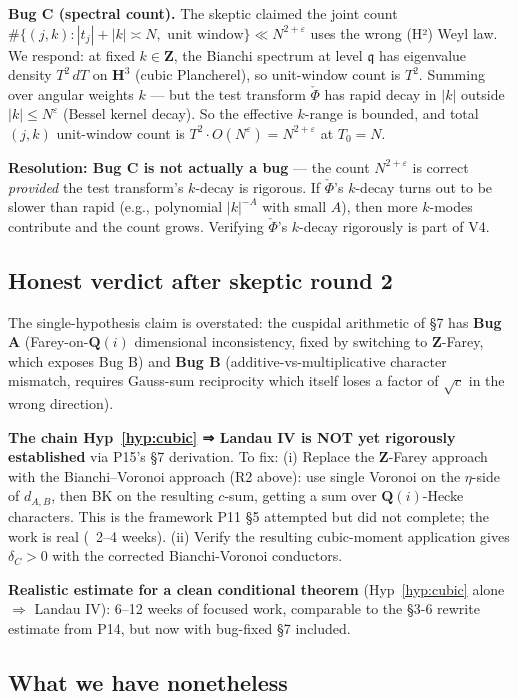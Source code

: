 \documentclass[11pt]{article}
\theoremstyle{definition}
\newcommand{\Z}{\mathbf{Z}}
\newcommand{\Q}{\mathbf{Q}}
\newcommand{\HH}{\mathbf{H}}
\newcommand{\Qi}{\Q(i)}
\newcommand{\qq}{\mathfrak{q}}
\begin{document}
\textbf{Bug C (spectral count).}
The skeptic claimed the joint count $\#\{(j,k):|t_j|+|k|\asymp N,\text{ unit window}\}\ll N^{2+\varepsilon}$ uses the wrong (H²) Weyl law. We respond: at fixed $k\in\Z$, the Bianchi spectrum at level $\qq$ has eigenvalue density $T^2\,dT$ on $\HH^3$ (cubic Plancherel), so unit-window count is $T^2$. Summing over angular weights $k$ — but the test transform $\check\Phi$ has rapid decay in $|k|$ outside $|k|\le N^\varepsilon$ (Bessel kernel decay). So the effective $k$-range is bounded, and total $(j,k)$ unit-window count is $T^2\cdot O(N^\varepsilon)=N^{2+\varepsilon}$ at $T_0=N$.

\textbf{Resolution: Bug C is not actually a bug} — the count $N^{2+\varepsilon}$ is correct \emph{provided} the test transform's $k$-decay is rigorous. If $\check\Phi$'s $k$-decay turns out to be slower than rapid (e.g., polynomial $|k|^{-A}$ with small $A$), then more $k$-modes contribute and the count grows. Verifying $\check\Phi$'s $k$-decay rigorously is part of V4.

\subsection*{Honest verdict after skeptic round 2}

The single-hypothesis claim is overstated: the cuspidal arithmetic of §7 has \textbf{Bug A} (Farey-on-$\Qi$ dimensional inconsistency, fixed by switching to $\Z$-Farey, which exposes Bug B) and \textbf{Bug B} (additive-vs-multiplicative character mismatch, requires Gauss-sum reciprocity which itself loses a factor of $\sqrt c$ in the wrong direction).

\textbf{The chain Hyp~\ref{hyp:cubic} ⇒ Landau IV is NOT yet rigorously established} via P15's §7 derivation. To fix:
(i) Replace the $\Z$-Farey approach with the Bianchi--Voronoi approach (R2 above): use single Voronoi on the $\eta$-side of $d_{A,B}$, then BK on the resulting $c$-sum, getting a sum over $\Qi$-Hecke characters. This is the framework P11 §5 attempted but did not complete; the work is real (~2--4 weeks).
(ii) Verify the resulting cubic-moment application gives $\delta_C>0$ with the corrected Bianchi-Voronoi conductors.

\textbf{Realistic estimate for a clean conditional theorem} (Hyp~\ref{hyp:cubic} alone $\Rightarrow$ Landau IV): 6--12 weeks of focused work, comparable to the §3-6 rewrite estimate from P14, but now with bug-fixed §7 included.

\subsection*{What we have nonetheless}
\end{document}
